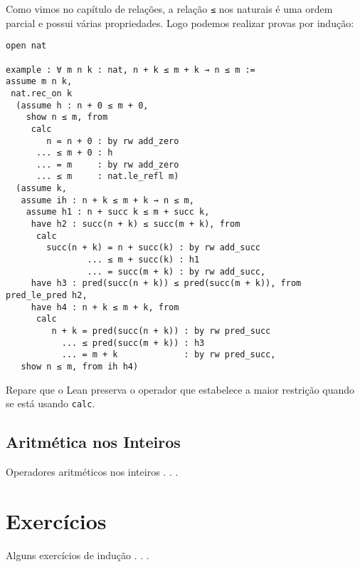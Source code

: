 Como vimos no capítulo de relações, a relação \lstinline{≤} nos naturais é uma ordem parcial e possui várias propriedades. Logo podemos realizar provas por indução:

\begin{lstlisting}
open nat

example : ∀ m n k : nat, n + k ≤ m + k → n ≤ m := 
assume m n k,
 nat.rec_on k 
  (assume h : n + 0 ≤ m + 0,
    show n ≤ m, from 
     calc
        n = n + 0 : by rw add_zero
      ... ≤ m + 0 : h
      ... = m     : by rw add_zero
      ... ≤ m     : nat.le_refl m)
  (assume k,
   assume ih : n + k ≤ m + k → n ≤ m,
    assume h1 : n + succ k ≤ m + succ k,
     have h2 : succ(n + k) ≤ succ(m + k), from 
      calc
        succ(n + k) = n + succ(k) : by rw add_succ
                ... ≤ m + succ(k) : h1
                ... = succ(m + k) : by rw add_succ,
     have h3 : pred(succ(n + k)) ≤ pred(succ(m + k)), from pred_le_pred h2,
     have h4 : n + k ≤ m + k, from 
      calc
         n + k = pred(succ(n + k)) : by rw pred_succ
           ... ≤ pred(succ(m + k)) : h3
           ... = m + k             : by rw pred_succ, 
   show n ≤ m, from ih h4)
\end{lstlisting}

Repare que o Lean preserva o operador que estabelece a maior restrição quando se está usando \lstinline{calc}.

\subsection{Aritmética nos Inteiros}

Operadores aritméticos nos inteiros . . .

\section{Exercícios}

Alguns exercícios de indução . . .